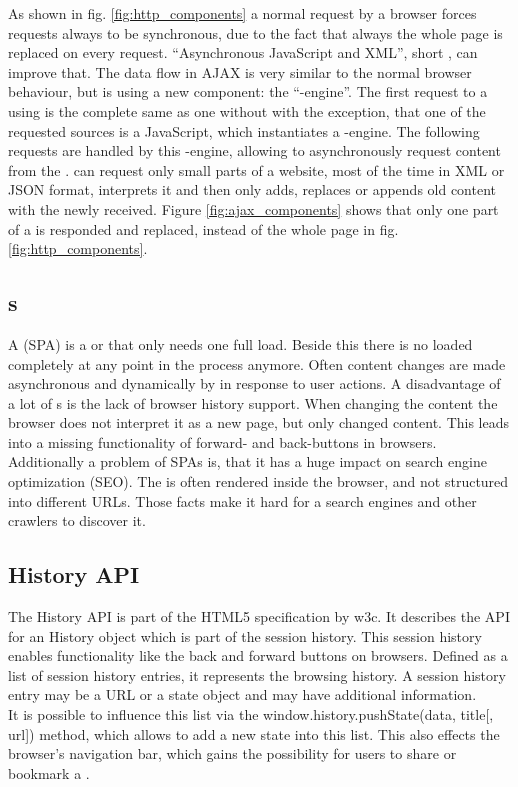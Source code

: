 \noindent{}As shown in fig. \ref{fig:http_components} a normal \http{} request by a browser forces requests always to be synchronous, due to the fact that always the whole page is replaced on every request.
\enquote{Asynchronous JavaScript and XML}, short \ajax{}, can improve that.
The data flow in AJAX is very similar to the normal browser behaviour, but is using a new component: the \enquote{\ajax{}-engine}.
The first request to a \webServer{} using \ajax{} is the complete same as one without \ajax{} with the exception, that one of the requested sources is a JavaScript, which instantiates a \ajax{}-engine.
The following requests are handled by this \ajax{}-engine, allowing to asynchronously request content from the \webServer{}.
\ajax{} can request only small parts of a website, most of the time in XML or JSON format, interprets it and then only adds, replaces or appends old content with the newly received.
Figure \ref{fig:ajax_components} shows that only one part of a \webPage{} is responded and replaced, instead of the whole page in fig. \ref{fig:http_components}.

\subsection{\SinglePageApplication{}s\label{singlePageApplication}}
A \singlePageApplication{} (SPA) is a \webApplication{} or \webSite{} that only needs one full \webPage{} load.
Beside this there is no \webPage{} loaded completely at any point in the process anymore.
Often content changes are made asynchronous and dynamically by \ajax{} in response to user actions.
A disadvantage of a lot of \singlePageApplication{}s is the lack of browser history support.
When changing the content the browser does not interpret it as a new page, but only changed content.
This leads into a missing functionality of forward- and back-buttons in browsers.
\\
Additionally a problem of SPAs is, that it has a huge impact on search engine optimization (SEO).
The \webPage{} is often rendered inside the browser, and not structured into different URLs.
Those facts make it hard for a search engines and other crawlers to discover it.

\subsection{History API}
The History API is part of the HTML5 specification by \gls{w3c}.
It describes the API for an History object which is part of the session history.
This session history enables functionality like the back and forward buttons on browsers.
Defined as a list of session history entries, it represents the browsing history.
A session history entry may be a URL or a state object and may have additional information.
\\
It is possible to influence this list via the window.history.pushState(data, title[, url]) method, which allows to add a new state into this list.
This also effects the browser's navigation bar, which gains the possibility for users to share or bookmark a \webPage{}.
\\